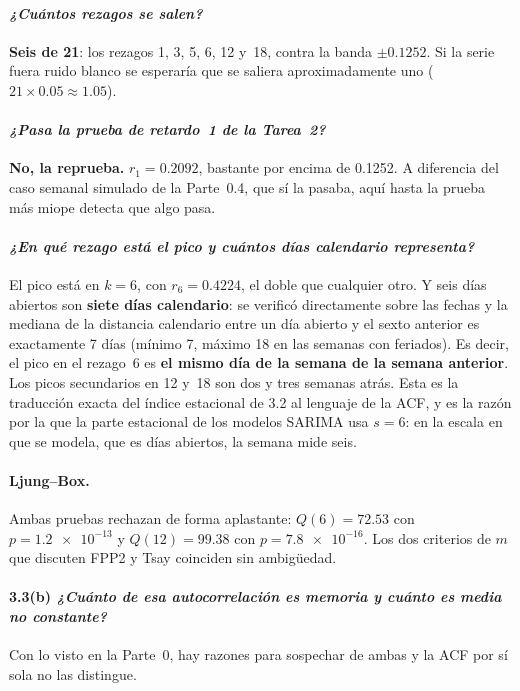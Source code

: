 \documentclass[11pt]{article}
\begin{document}
\paragraph{{\normalfont\itshape ¿Cu\'antos rezagos se salen?}} \textbf{Seis
de \num{21}}: los rezagos \num{1}, \num{3}, \num{5}, \num{6}, \num{12}
y~\num{18}, contra la banda $\pm\num{0.1252}$. Si la serie fuera ruido
blanco se esperar\'ia que se saliera aproximadamente uno
($21 \times 0.05 \approx 1.05$).

\paragraph{{\normalfont\itshape ¿Pasa la prueba de retardo~1 de la
Tarea~2?}} \textbf{No, la reprueba.} $r_1 = \num{0.2092}$, bastante por
encima de \num{0.1252}. A diferencia del caso semanal simulado de la
Parte~0.4, que s\'i la pasaba, aqu\'i hasta la prueba m\'as miope detecta
que algo pasa.

\paragraph{{\normalfont\itshape ¿En qu\'e rezago est\'a el pico y cu\'antos
d\'ias calendario representa?}} El pico est\'a en \textbf{$k=6$}, con
$r_6 = \num{0.4224}$, el doble que cualquier otro. Y seis d\'ias abiertos
son \textbf{siete d\'ias calendario}: se verific\'o directamente sobre las
fechas y la mediana de la distancia calendario entre un d\'ia abierto y el
sexto anterior es exactamente \num{7} d\'ias (m\'inimo \num{7}, m\'aximo
\num{18} en las semanas con feriados). Es decir, el pico en el rezago~6 es
\textbf{el mismo d\'ia de la semana de la semana anterior}. Los picos
secundarios en \num{12} y~\num{18} son dos y tres semanas atr\'as. Esta es la
traducci\'on exacta del \'indice estacional de 3.2 al lenguaje de la ACF, y
es la raz\'on por la que la parte estacional de los modelos SARIMA usa
$s=6$: en la escala en que se modela, que es d\'ias abiertos, la semana mide
seis.

\paragraph{Ljung--Box.}

Ambas pruebas rechazan de forma aplastante: $Q(6)=\num{72.53}$ con
$p = \num{1.2e-13}$ y $Q(12)=\num{99.38}$ con $p = \num{7.8e-16}$. Los dos
criterios de $m$ que discuten FPP2 y Tsay coinciden sin ambig\"uedad.

\paragraph{3.3(b) {\normalfont\itshape ¿Cu\'anto de esa autocorrelaci\'on es
memoria y cu\'anto es media no constante?}} Con lo visto en la Parte~0, hay
razones para sospechar de ambas y la ACF por s\'i sola no las distingue.
\end{document}
